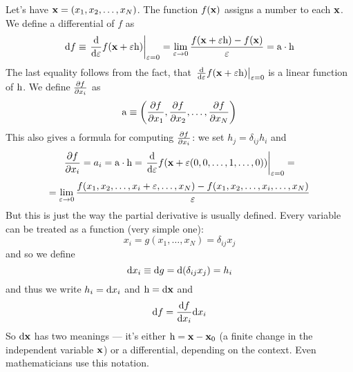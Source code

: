 Let's have ${\bf x}=(x_1,x_2,\dots,x_N)$. The function $f({\bf x})$ assigns a number to each ${\bf x}$. We define a differential of $f$ as 
\begin{equation*}
  {\rm d} f\equiv \left.{{\rm d}\over{\rm d}\varepsilon}f({\bf x}+\varepsilon{\rm h}) \right|_{\varepsilon=0} =\lim_{\varepsilon\to0} {f({\bf x}+\varepsilon{\rm h})-f({\bf x})\over\varepsilon}={\rm a}\cdot{\rm h}
\end{equation*}
The last equality follows from the fact, that $\left.{{\rm d}\over{\rm d}\varepsilon}f({\bf x}+\varepsilon{\rm h}) \right|_{\varepsilon=0}$ is a linear function of ${\rm h}$. We define ${\partial f\over\partial x_i}$ as 
\begin{equation*}
  {\rm a}\equiv\left({\partial f\over\partial x_1},{\partial f\over\partial x_2}, \dots,{\partial f\over\partial x_N}\right)
\end{equation*}
This also gives a formula for computing ${\partial f\over\partial x_i}$: we set $h_j=\delta_{ij}h_i$ and 
\begin{equation*}
  {\partial f\over\partial x_i}=a_i={\rm a}\cdot{\rm h}=\left.{{\rm d}\over{\rm d}\varepsilon} f({\bf x}+\varepsilon(0,0,\dots,1,\dots,0))\right|_{\varepsilon=0}=
\end{equation*}
\begin{equation*}
  =\lim_{\varepsilon\to0} {f(x_1,x_2,\dots,x_i+\varepsilon,\dots,x_N)-f(x_1,x_2,\dots,x_i,\dots,x_N) \over\varepsilon}
\end{equation*}
But this is just the way the partial derivative is usually defined. Every variable can be treated as a function (very simple one): 
\begin{equation*}
  x_i=g(x_1,\dots,x_N)=\delta_{ij}x_j
\end{equation*}
and so we define 
\begin{equation*}
  {\rm d} x_i\equiv{\rm d} g={\rm d}(\delta_{ij}x_j)=h_i
\end{equation*}
and thus we write $h_i={\rm d} x_i$ and ${\rm h}={\rm d}{\bf x}$ and 
\begin{equation*}
  {\rm d} f={{\rm d} f\over{\rm d} x_i}{\rm d} x_i
\end{equation*}
So ${\rm d}{\bf x}$ has two meanings --- it's either ${\rm h}={\bf x}-{\bf x}_0$ (a finite change in the independent variable ${\bf x}$) or a differential, depending on the context. Even mathematicians use this notation.

